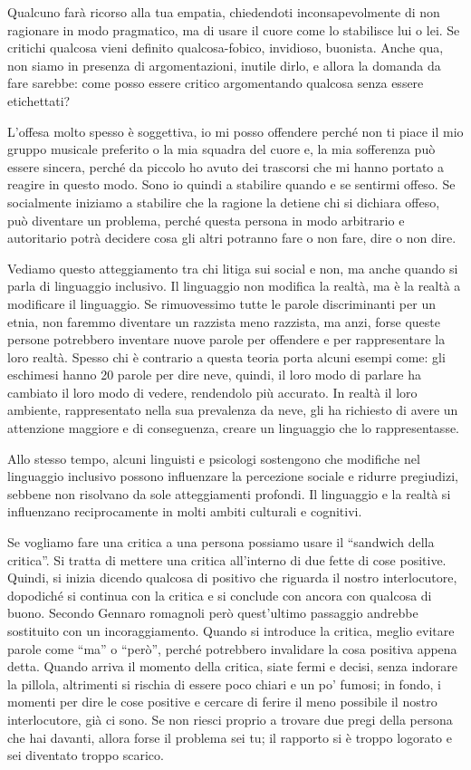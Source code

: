 \documentclass[12pt]{book} %
\begin{document}
Qualcuno farà ricorso alla tua empatia, chiedendoti inconsapevolmente di non ragionare in modo pragmatico, ma di usare il cuore come lo stabilisce lui o lei. Se critichi qualcosa vieni definito qualcosa-fobico, invidioso, buonista. Anche qua, non siamo in presenza di argomentazioni, inutile dirlo, e allora la domanda da fare sarebbe: come posso essere critico argomentando qualcosa senza essere etichettati?

L'offesa molto spesso è soggettiva, io mi posso offendere perché non ti piace il mio gruppo musicale preferito o la mia
squadra del cuore e, la mia sofferenza può essere sincera, perché da piccolo ho avuto dei trascorsi che mi hanno
portato a reagire in questo modo. Sono io quindi a stabilire quando e se sentirmi offeso. Se socialmente iniziamo a
stabilire che la ragione la detiene chi si dichiara offeso, può diventare un problema, perché questa persona in modo
arbitrario e autoritario potrà decidere cosa gli altri potranno fare o non fare, dire o non dire.

Vediamo questo atteggiamento tra chi litiga sui social e non, ma anche quando si parla di linguaggio inclusivo. Il
linguaggio non modifica la realtà, ma è la realtà a modificare il linguaggio. Se rimuovessimo tutte le parole
discriminanti per un etnia, non faremmo diventare un razzista meno razzista, ma anzi, forse queste persone
potrebbero inventare nuove parole per offendere e per rappresentare la loro realtà.
Spesso chi è contrario a questa teoria porta alcuni esempi come: gli eschimesi hanno 20 parole per dire neve, quindi, il loro modo di parlare ha cambiato il loro modo di vedere, rendendolo più accurato. In realtà il loro ambiente, rappresentato nella sua prevalenza da neve, gli ha richiesto di avere un attenzione maggiore e di conseguenza, creare un linguaggio che lo rappresentasse.

Allo stesso tempo, alcuni linguisti e psicologi sostengono che modifiche nel linguaggio inclusivo possono influenzare la percezione sociale e ridurre pregiudizi, sebbene non risolvano da sole atteggiamenti profondi. Il linguaggio e la realtà si influenzano reciprocamente in molti ambiti culturali e cognitivi.

Se vogliamo fare una critica a una persona possiamo usare il “sandwich della critica”. Si tratta di mettere una critica
all'interno di due fette di cose positive. Quindi, si inizia dicendo qualcosa di positivo che
riguarda il nostro interlocutore, dopodiché si continua con la critica e si conclude con ancora con qualcosa di buono.
Secondo Gennaro romagnoli però quest'ultimo passaggio andrebbe sostituito con un incoraggiamento. 
Quando si introduce la critica, meglio evitare parole come “ma” o “però”, perché potrebbero invalidare la cosa
positiva appena detta. Quando arriva il momento della critica, siate fermi e decisi, senza indorare la pillola,
altrimenti si rischia di essere poco chiari e un po' fumosi; in fondo, i momenti per dire le cose
positive e cercare di ferire il meno possibile il nostro interlocutore, già ci sono. Se non riesci proprio a trovare
due pregi della persona che hai davanti, allora forse il problema sei tu; il rapporto si è troppo logorato e sei
diventato troppo scarico.
\end{document}
